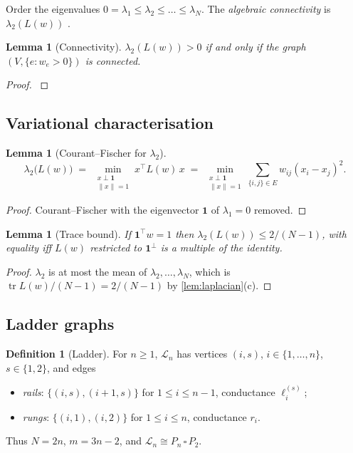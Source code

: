 \documentclass[11pt,a4paper]{article}
\newif\ifdraftnotes
\newcommand{\todo}[1]{\ifdraftnotes{\color{red!70!black}\sffamily[TODO: #1]}\fi}
\theoremstyle{plain}
\newtheorem{lemma}[theorem]{Lemma}
\theoremstyle{definition}
\newtheorem{definition}[theorem]{Definition}
\theoremstyle{remark}
\newcommand{\one}{\mathbf{1}}
\newcommand{\Lad}{\mathcal{L}}            %
\DeclareMathOperator{\tr}{tr}
\begin{document}
	Order the eigenvalues $0=\lambda_1\le\lambda_2\le\dots\le\lambda_N$. The
	\emph{algebraic connectivity} is $\lambda_2(L(w))$ \cite{Fiedler1973}.
	
	\begin{lemma}[Connectivity]\label{lem:connectivity}
		$\lambda_2(L(w))>0$ if and only if the graph $(V,\{e: w_e>0\})$ is
		connected.
	\end{lemma}
	\begin{proof}\todo{Kernel of $L(w)$ = functions constant on components,
			by \cref{lem:laplacian}(b).} \cite{Fiedler1973}
	\end{proof}
	
	\subsection{Variational characterisation}
	
	\begin{lemma}[Courant--Fischer for $\lambda_2$]\label{lem:cf}
		\[
		\lambda_2\bigl(L(w)\bigr)
		\;=\; \min_{\substack{x\perp\one\\ \|x\|=1}} x^\top L(w)\, x
		\;=\; \min_{\substack{x\perp\one\\ \|x\|=1}}
		\sum_{\{i,j\}\in E} w_{ij}(x_i-x_j)^2 .
		\]
	\end{lemma}
	\begin{proof}
		Courant--Fischer \cite[Thm.~4.2.6]{HornJohnson2013} with the eigenvector
		$\one$ of $\lambda_1=0$ removed. \todo{write out}
	\end{proof}
	
	\begin{lemma}[Trace bound]\label{lem:tracebound}
		If $\one^\top w=1$ then $\lambda_2(L(w))\le 2/(N-1)$, with equality iff
		$L(w)$ restricted to $\one^\perp$ is a multiple of the identity.
	\end{lemma}
	\begin{proof}
		$\lambda_2$ is at most the mean of $\lambda_2,\dots,\lambda_N$, which is
		$\tr L(w)/(N-1)=2/(N-1)$ by \cref{lem:laplacian}(c).
	\end{proof}
	
	\subsection{Ladder graphs}
	
	\begin{definition}[Ladder]\label{def:ladder}
		For $n\ge1$, $\Lad_n$ has vertices $(i,s)$, $i\in\{1,\dots,n\}$,
		$s\in\{1,2\}$, and edges
		\begin{itemize}
			\item \emph{rails}: $\{(i,s),(i+1,s)\}$ for $1\le i\le n-1$, conductance
			$\ell^{(s)}_i$;
			\item \emph{rungs}: $\{(i,1),(i,2)\}$ for $1\le i\le n$, conductance $r_i$.
		\end{itemize}
		Thus $N=2n$, $m=3n-2$, and $\Lad_n\cong P_n\,\square\,P_2$.
	\end{definition}
	
\end{document}
